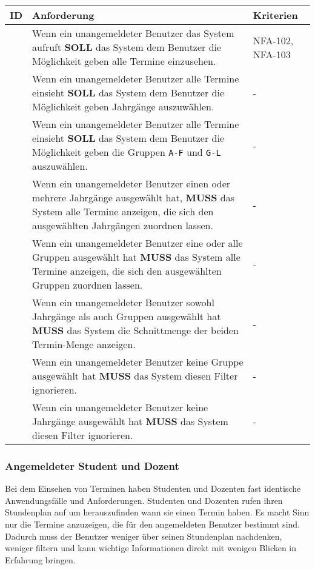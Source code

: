 \vspace{12pt}

\begin{tabular} {|p{}|p{}|p{}|}
	\hline
	ID & Anforderung & Kriterien \\
	\hline
	\printfreqnr
	& Wenn ein unangemeldeter Benutzer das System aufruft \textbf{SOLL} das System dem Benutzer die Möglichkeit geben alle Termine einzusehen. 
	& NFA-102, NFA-103 \\
	\hline
	\printfreqnr 
	& Wenn ein unangemeldeter Benutzer alle Termine einsieht \textbf{SOLL} das System dem Benutzer die Möglichkeit geben Jahrgänge auszuwählen.
	& -  \\
	\hline
	\printfreqnr 
	& Wenn ein unangemeldeter Benutzer alle Termine einsieht \textbf{SOLL} das System dem Benutzer die Möglichkeit geben die Gruppen \texttt{A-F} und \texttt{G-L} auszuwählen.
	& - \\
	\hline
	\printfreqnr
	& Wenn ein unangemeldeter Benutzer einen oder mehrere Jahrgänge ausgewählt hat, \textbf{MUSS} das System alle Termine anzeigen, die sich den ausgewählten Jahrgängen zuordnen lassen.
	& - \\
	\hline
	\printfreqnr
	& Wenn ein unangemeldeter Benutzer eine oder alle Gruppen ausgewählt hat \textbf{MUSS} das System alle Termine anzeigen, die sich den ausgewählten Gruppen zuordnen lassen.
	& - \\
	\hline
	\printfreqnr
	& Wenn ein unangemeldeter Benutzer sowohl Jahrgänge als auch Gruppen ausgewählt hat \textbf{MUSS} das System die Schnittmenge der beiden Termin-Menge anzeigen.
	& - \\
	\hline
	\printfreqnr
	& Wenn ein unangemeldeter Benutzer keine Gruppe ausgewählt hat \textbf{MUSS} das System diesen Filter ignorieren.
	& - \\
	\hline
	\printfreqnr
	& Wenn ein unangemeldeter Benutzer keine Jahrgänge ausgewählt hat \textbf{MUSS} das System diesen Filter ignorieren.
	& - \\
	\hline
\end{tabular}

\newpage

\subsubsection{Angemeldeter Student und Dozent}
Bei dem Einsehen von Terminen haben Studenten und Dozenten fast identische Anwendungsfälle und Anforderungen. Studenten und Dozenten rufen ihren Stundenplan auf um herauszufinden wann sie einen Termin haben. Es macht Sinn nur die Termine anzuzeigen, die für den angemeldeten Benutzer bestimmt sind. Dadurch muss der Benutzer weniger über seinen Stundenplan nachdenken, weniger filtern und kann wichtige Informationen direkt mit wenigen Blicken in Erfahrung bringen. 

